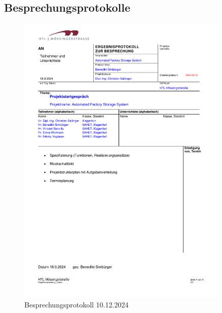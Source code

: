\subsection{Besprechungsprotokolle}
\begin{figure}[H]
    \includegraphics[width=0.9\textwidth]{../Protokolls/Projektbesprechung_0.pdf}
    \centering
    \caption{Besprechungsprotokoll 10.12.2024}
\end{figure}

